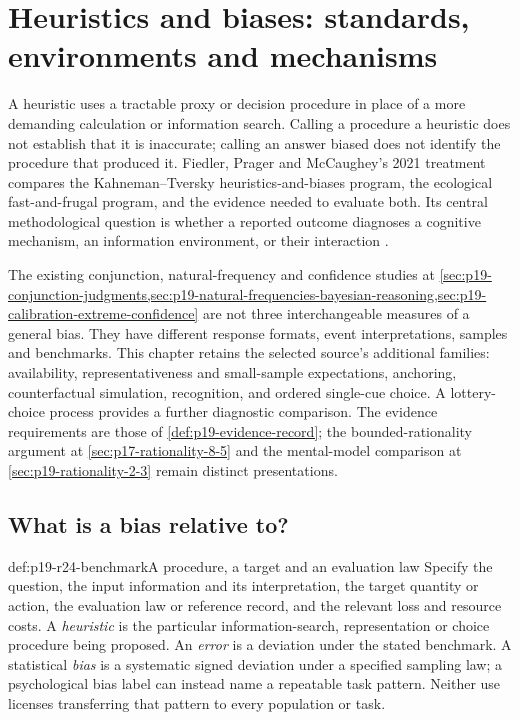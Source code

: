 \chapter{Heuristics and biases: standards, environments and mechanisms}
\label{sec:p19-rationality-2-4}

A heuristic uses a tractable proxy or decision procedure in place of a
more demanding calculation or information search. Calling a procedure a
heuristic does not establish that it is inaccurate; calling an answer
biased does not identify the procedure that produced it. Fiedler, Prager
and McCaughey's 2021 treatment compares the Kahneman--Tversky
heuristics-and-biases program, the ecological fast-and-frugal program,
and the evidence needed to evaluate both. Its central methodological
question is whether a reported outcome diagnoses a cognitive mechanism,
an information environment, or their interaction
\cite[pp.~159--168]{FiedlerPragerMcCaughey2021Heuristics}.

The existing conjunction, natural-frequency and confidence studies at
\cref{sec:p19-conjunction-judgments,sec:p19-natural-frequencies-bayesian-reasoning,sec:p19-calibration-extreme-confidence}
are not three interchangeable measures of a general bias. They have
different response formats, event interpretations, samples and
benchmarks. This chapter retains the selected source's additional
families: availability, representativeness and small-sample expectations,
anchoring, counterfactual simulation, recognition, and ordered single-cue
choice. A lottery-choice process provides a further diagnostic comparison.
The evidence requirements are those of \cref{def:p19-evidence-record};
the bounded-rationality argument at \cref{sec:p17-rationality-8-5} and
the mental-model comparison at \cref{sec:p19-rationality-2-3} remain
distinct presentations.

\section{What is a bias relative to?}
\label{sec:p19-r24-standards}

\begin{hbdefinition}{def:p19-r24-benchmark}{A procedure, a target and an evaluation law}
Specify the question, the input information and its interpretation,
the target quantity or action, the evaluation law or reference record,
and the relevant loss and resource costs. A \emph{heuristic} is the
particular information-search, representation or choice procedure being
proposed. An \emph{error} is a deviation under the stated benchmark.
A statistical \emph{bias} is a systematic signed deviation under a
specified sampling law; a psychological bias label can instead name a
repeatable task pattern. Neither use licenses transferring that pattern
to every population or task.
\end{hbdefinition}

